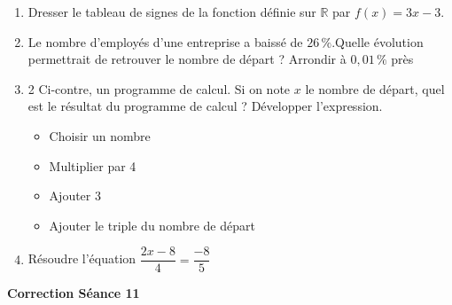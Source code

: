 \documentclass[a4paper,11pt]{article}
\begin{document}
\begin{seanceD}{}
\begin{enumerate}
\begin{center}
\begin{tikzpicture}[baseline,scale = 0.3]
\end{tikzpicture}
\end{center}

\item  Dresser le tableau de signes de la fonction définie sur $\mathbb R$ par $f(x)=3x-3$.

\item  Le nombre d'employés d'une entreprise a baissé de $26\,\%$.Quelle évolution permettrait de retrouver le nombre de départ ? Arrondir à $0,01\,\%$ près \dotfill

\item \begin{multicols}{2}
Ci-contre, un programme de calcul.
Si on note $x$ le nombre de départ, quel est le résultat du programme de calcul ? Développer l'expression.

\dotfill
	\begin{itemize}
		\item Choisir un nombre
		\item Multiplier par 4
		\item Ajouter 3
		\item Ajouter le triple du nombre de départ
	\end{itemize}
\end{multicols}

\item  Résoudre l'équation $\dfrac{2x-8}{4}=\dfrac{-8}{5}$ \dotfill 

\dotfill

\end{enumerate}
\end{seanceD}

\begin{center}

\textbf{\textcolor{Couleur8}{Correction Séance 11}}\\
\vspace{2mm}

\end{center}

\newpage
\end{document}
